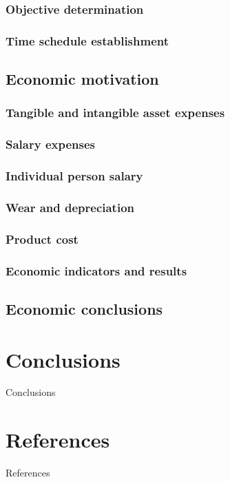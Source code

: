 \documentclass[12pt,a4paper]{report}
\begin{document}
\subsection{Objective determination}
\subsection{Time schedule establishment}
\section{Economic motivation}
\subsection{Tangible and intangible asset expenses}
\subsection{Salary expenses}
\subsection{Individual person salary}
\subsection{Wear and depreciation}
\subsection{Product cost}
\subsection{Economic indicators and results}
\section{Economic conclusions}

\chapter*{Conclusions}
Conclusions

\chapter*{References}
References
\end{document}
